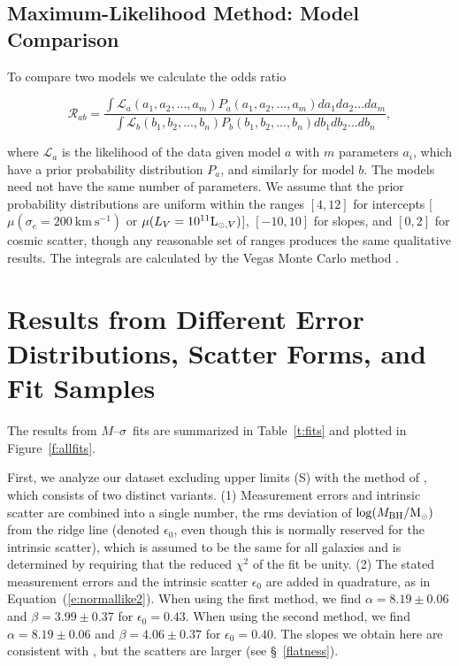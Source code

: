 \documentclass[twosided,letterpaper,numberedappendix]{emulateapj}
\newcommand{\beq}{
\begin{equation}
}
\newcommand{\eeq}{
\end{equation}
}
\newcommand{\msun}     {\ensuremath{{\rm M}_{\scriptscriptstyle \odot}}}
\newcommand{\kms}      {\ensuremath{~\mathrm{km~s^{-1}}}}
\newcommand{\msigma}   {\ensuremath{M}{--}\ensuremath{\sigma}}
\newcommand{\mbh}      {\ensuremath{M_{\mathrm{BH}}}}
\begin{document}
\subsection{Maximum-Likelihood Method:  Model Comparison}
\label{modelcomp}
To compare two models we calculate the odds ratio
\beq
{\mathcal R_{ab}} = \frac{\int{\mathcal L_a}(a_1, a_2, ..., a_m)
P_a(a_1, a_2, ..., a_m)da_1 da_2 ... da_m}
{\int{\mathcal L_b}(b_1, b_2, ..., b_n)
P_b(b_1, b_2, ..., b_n)db_1 db_2 ... db_n},
\label{e:oddsratio}
\eeq
%
where ${\mathcal L_a}$ is the likelihood of the data given model $a$
with $m$ parameters $a_i$, which have a prior probability distribution
$P_a$, and similarly for model $b$.  The models need not have the same
number of parameters.  We assume that the prior probability
distributions are uniform within the ranges $[4, 12]$ for intercepts
[$\mu(\sigma_e=200\kms)$ or $\mu(L_V = 10^{11} {\rm L}_{{\scriptscriptstyle 
\odot},V})$], $[-10,10]$ for slopes, and $[0, 2]$ for cosmic scatter, 
though any reasonable set of ranges
produces the same qualitative results.  The integrals are calculated
by the Vegas Monte Carlo method \citep{lepage78}.

\section{Results from Different Error Distributions, Scatter Forms, and Fit Samples}
\label{difffits}
The results from \msigma\ fits are summarized in Table~\ref{t:fits}
and plotted in Figure~\ref{f:allfits}.  

First, we analyze our dataset excluding upper limits (S) with the
method of \citet{tremaineetal02}, which consists of two distinct
variants. (1) Measurement errors and intrinsic scatter are combined
into a single number, the rms deviation of $\log(\mbh/\msun)$ from the
ridge line (denoted $\epsilon_0$, even though this is normally
reserved for the intrinsic scatter), which is assumed to be the same
for all galaxies and is determined by requiring that the reduced
$\chi^2$ of the fit be unity.  (2) The stated measurement errors and
the intrinsic scatter $\epsilon_0$ are added in quadrature, as in
Equation~(\ref{e:normallike2}).  When using the first method, we find
$\alpha = 8.19 \pm 0.06$ and $\beta = 3.99 \pm 0.37$ for $\epsilon_0 =
0.43$.  When using the second method, we find $\alpha = 8.19 \pm 0.06$
and $\beta = 4.06 \pm 0.37$ for $\epsilon_0 = 0.40$.  The slopes we
obtain here are consistent with \citet{tremaineetal02}, but the
scatters are larger (see \S~\ref{flatness}).
\end{document}
